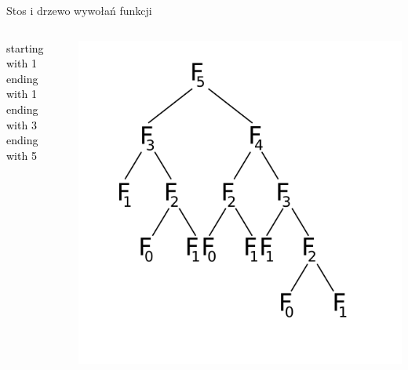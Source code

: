 \begin{frame}{Stos i drzewo wywołań funkcji}
\begin{columns}
\begin{column}{0.25\textwidth}
            \textcolor{black}{starting with 1}\\
            \textcolor{black}{ending with 1}\\
            \textcolor{black}{ending with 3}\\
            \textcolor{black}{ending with 5}\\
        \end{column}
        \begin{column}{0.5\textwidth}
            \includegraphics[width=\textwidth]{graphics/recursion/fibonacci_black.png}
        \end{column}
    \end{columns}
\end{frame}

